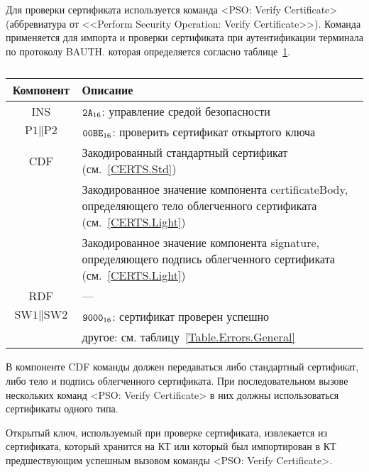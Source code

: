 Для проверки сертификата используется команда 
<PSO: Verify Certificate> (аббревиатура от <<Perform Security 
Operation: Verify Certificate>>).
Команда применяется для импорта и проверки 
сертификата при аутентификации терминала по протоколу BAUTH. 
которая определяется согласно 
таблице~\ref{Table.Oper.VerifyCertCmd}.

\begin{table}[hbt]
\caption{}\label{Table.Oper.VerifyCertCmd}
\begin{tabular}{|c|p{14cm}|}
\hline
Компонент & Описание\\ 
\hline
\hline
INS & $\texttt{2A}_{16}$: управление средой безопасности \\
\hline
$\text{P1} \parallel \text{P2}$ & $\texttt{00BE}_{16}$: проверить 
сертификат откыртого ключа \\ 
\hline
CDF & Закодированный стандартный сертификат (см.~\ref{CERTS.Std})\\
 & Закодированное значение компонента certificateBody, определяющего тело 
облегченного сертификата (см.~\ref{CERTS.Light})\\
 & Закодированное значение компонента signature, определяющего подпись 
облегченного сертификата (см.~\ref{CERTS.Light})\\
\hline 
RDF &  --- \\
\hline
$\text{SW1} \parallel \text{SW2}$ & $\texttt{9000}_{16}$: сертификат проверен успешно \\
 & другое: см. таблицу~\ref{Table.Errors.General} \\
\hline
\end{tabular}
\end{table}

В компоненте CDF команды должен передаваться либо стандартный сертификат, 
либо тело и подпись облегченного сертификата. При последовательном вызове 
нескольких команд <PSO: Verify Certificate> в них должны использоваться 
сертификаты одного типа. 

Открытый ключ, используемый при проверке сертификата, извлекается из 
сертификата, который хранится на КТ или который был импортирован в КТ 
предшествующим успешным вызовом команды <PSO: Verify Certificate>.


